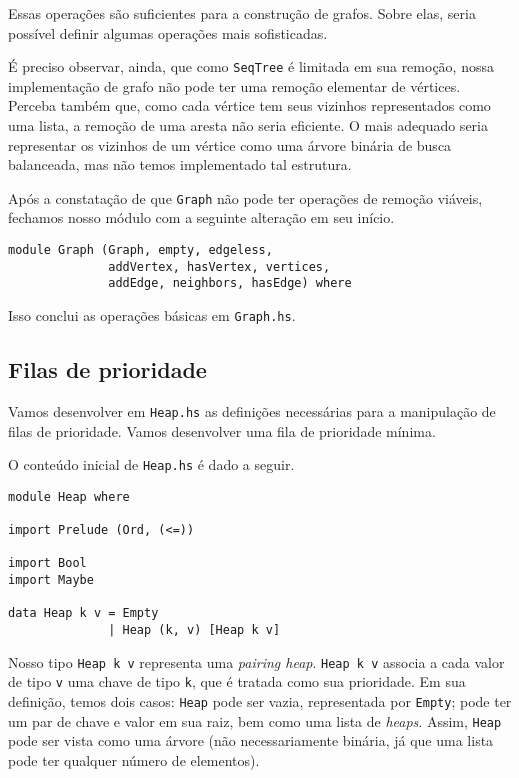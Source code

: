 \documentclass[a4paper]{article}
\begin{document}
Essas operações são suficientes para a construção de grafos.
Sobre elas, seria possível definir algumas operações mais sofisticadas.

É preciso observar, ainda, que como \texttt{SeqTree} é limitada em sua remoção, nossa implementação de grafo não pode ter uma remoção elementar de vértices.
Perceba também que, como cada vértice tem seus vizinhos representados como uma lista, a remoção de uma aresta não seria eficiente.
O mais adequado seria representar os vizinhos de um vértice como uma árvore binária de busca balanceada, mas não temos implementado tal estrutura.

Após a constatação de que \texttt{Graph} não pode ter operações de remoção viáveis, fechamos nosso módulo com a seguinte alteração em seu início.

\begin{verbatim}
module Graph (Graph, empty, edgeless,
              addVertex, hasVertex, vertices,
              addEdge, neighbors, hasEdge) where
\end{verbatim}

Isso conclui as operações básicas em \texttt{Graph.hs}.

\subsection{Filas de prioridade}

Vamos desenvolver em \texttt{Heap.hs} as definições necessárias para a manipulação de filas de prioridade.
Vamos desenvolver uma fila de prioridade mínima.

O conteúdo inicial de \texttt{Heap.hs} é dado a seguir.

\begin{verbatim}
module Heap where

import Prelude (Ord, (<=))

import Bool
import Maybe

data Heap k v = Empty
              | Heap (k, v) [Heap k v]
\end{verbatim}

Nosso tipo \texttt{Heap k v} representa uma \emph{pairing heap}.
\texttt{Heap k v} associa a cada valor de tipo \texttt{v} uma chave de tipo \texttt{k}, que é tratada como sua prioridade.
Em sua definição, temos dois casos: \texttt{Heap} pode ser vazia, representada por \texttt{Empty}; pode ter um par de chave e valor em sua raiz, bem como uma lista de \emph{heaps}.
Assim, \texttt{Heap} pode ser vista como uma árvore (não necessariamente binária, já que uma lista pode ter qualquer número de elementos).
\end{document}

